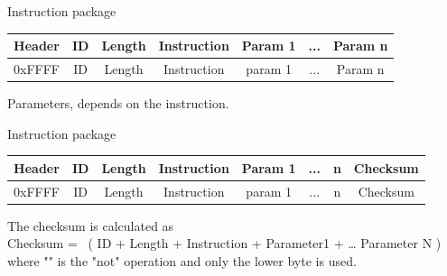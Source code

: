 \documentclass{beamer}
\begin{document}


\begin{frame}{Instruction package}
 
    \begin{table}
        \begin{flushleft}
            \begin{tabular}{| c | c | c | c | c | c | c |}
                \hline
                Header & ID & Length & Instruction & Param 1 & ... & Param n\\
                \hline
                0xFFFF & ID & Length & Instruction & param 1 & ... & Param n\\
                \hline
            \end{tabular}
        \end{flushleft}
    \end{table}

    Parameters, depends on the instruction.
    
\end{frame}




\begin{frame}{Instruction package}

    \begin{table}
        \begin{flushleft}
            \begin{tabular}{| c | c | c | c | c | c | c | c |}
                \hline
                Header & ID & Length & Instruction & Param 1 & ... & n & Checksum\\
                \hline
                0xFFFF & ID & Length & Instruction & param 1 & ... & n & Checksum\\
                \hline
            \end{tabular}
        \end{flushleft}
    \end{table}

    The checksum is calculated as\\
    Checksum = ~( ID + Length + Instruction + Parameter1 + … Parameter N )\\
    where "" is the "not" operation and only the lower byte is used.
\end{frame}

\end{document}
